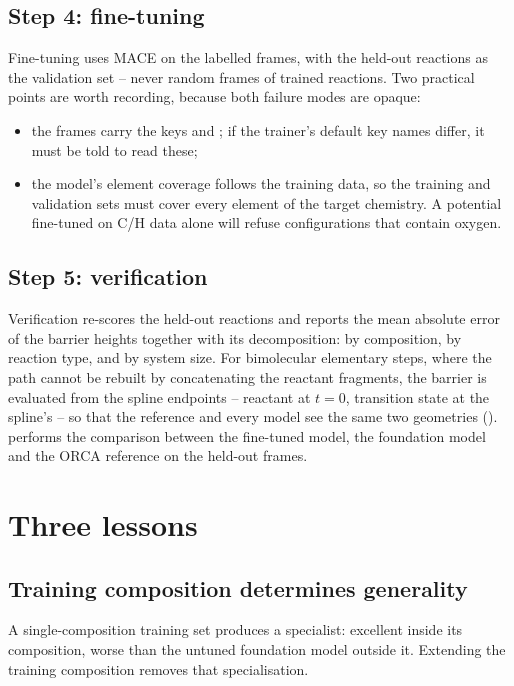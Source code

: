 \subsection{Step 4: fine-tuning}
\label{sec:al-finetune}

Fine-tuning uses MACE \cite{batatia2022mace} on the labelled frames, with the
held-out reactions as the validation set -- never random frames of trained
reactions.  Two practical points are worth recording, because both failure
modes are opaque:

\begin{itemize}
  \item the frames carry the keys  and ; if the
        trainer's default key names differ, it must be told to read these;
  \item the model's element coverage follows the training data, so the
        training and validation sets must cover every element of the target
        chemistry.  A potential fine-tuned on C/H data alone will refuse
        configurations that contain oxygen.
\end{itemize}

\subsection{Step 5: verification}
\label{sec:al-verify}

Verification re-scores the held-out reactions and reports the mean absolute
error of the barrier heights together with its decomposition: by composition,
by reaction type, and by system size.  For bimolecular elementary steps, where
the path cannot be rebuilt by concatenating the reactant fragments, the
barrier is evaluated from the spline endpoints -- reactant at $t=0$,
transition state at the spline's  -- so that the reference
and every model see the same two geometries
().   performs the
comparison between the fine-tuned model, the foundation model and the ORCA
reference on the held-out frames.

\section{Three lessons}
\label{sec:al-lessons}

\subsection{Training composition determines generality}
A single-composition training set produces a specialist: excellent inside its
composition, worse than the untuned foundation model outside it.  Extending
the training composition removes that specialisation.

